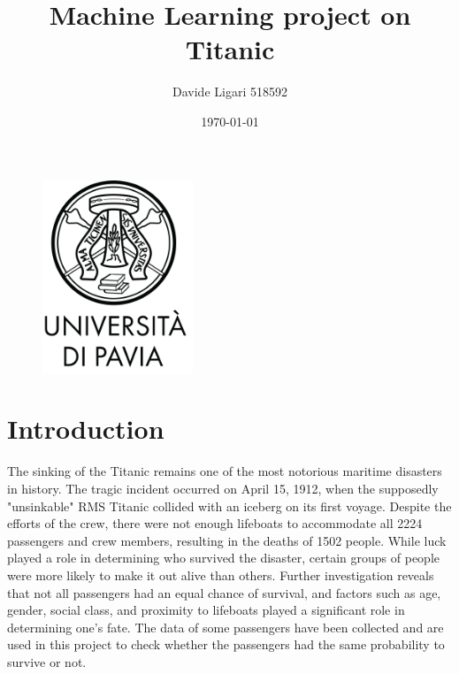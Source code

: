 \documentclass{article}
\begin{document}
\begin{figure}[t]
  \centering
  \includegraphics[width=0.4\textwidth]{images/logo.png}
\end{figure}

\title{Machine Learning project on Titanic}

\author{Davide Ligari 518592}
\date{\today}


\maketitle

\clearpage
\setcounter{page}{1}


\tableofcontents
\clearpage
\section{Introduction}
The sinking of the Titanic remains one of the most notorious maritime disasters in history.
The tragic incident occurred on April 15, 1912, when the supposedly "unsinkable" RMS Titanic collided with an iceberg on its first voyage.
Despite the efforts of the crew, there were not enough lifeboats to accommodate all 2224 passengers and crew members, resulting in the deaths of 1502 people.
While luck played a role in determining who survived the disaster, certain groups of people were more likely to make it out alive than others.
Further investigation reveals that not all passengers had an equal chance of survival, and factors such as age, gender, social class,
and proximity to lifeboats played a significant role in determining one's fate.
The data of some passengers have been collected and are used in this project to check whether the passengers had the same probability to survive or not.
\end{document}
